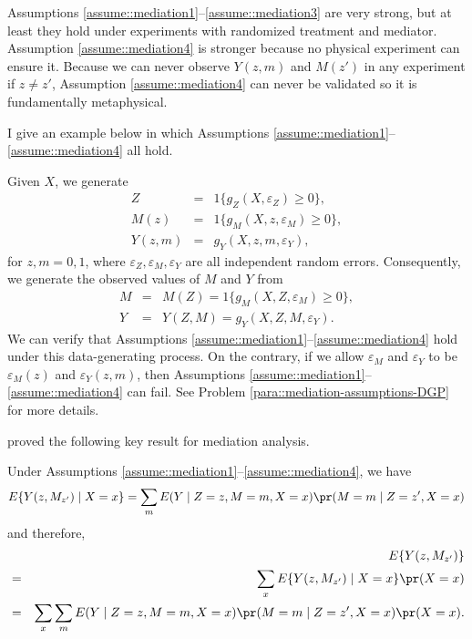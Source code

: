 Assumptions \ref{assume::mediation1}--\ref{assume::mediation3} are very strong, but at least they hold under experiments with randomized treatment and mediator. Assumption \ref{assume::mediation4} is stronger because no physical experiment can ensure it. Because we can never observe $Y(z,m)$ and $ M(z') $ in any experiment if $z\neq z'$, Assumption \ref{assume::mediation4}  can never be validated so it is fundamentally metaphysical. 

I give an example below in which Assumptions \ref{assume::mediation1}--\ref{assume::mediation4} all hold. 

\begin{example}
\label{eg::mediation-assumptions}
Given $X$, we generate
\begin{eqnarray*}
Z &=& 1\{  g_Z(X, \varepsilon_Z)  \geq 0 \} ,\\
M(z) &=& 1\{   g_M(X, z, \varepsilon_M)  \geq 0 \} ,\\
Y(z,m) &=& g_Y(X, z, m, \varepsilon_Y ),
\end{eqnarray*}
for $z,m = 0,1$,
where 
$
\varepsilon_Z, \varepsilon_M,
\varepsilon_Y 
$
are all independent random errors. Consequently, we generate the observed values of $M$ and $Y$ from
\begin{eqnarray*}
M &=& M(Z) = 1\{   g_M(X, Z, \varepsilon_M)  \geq 0 \},\\
Y &=& Y(Z,M) = g_Y(X, Z, M, \varepsilon_Y ) . 
\end{eqnarray*}
We can verify that Assumptions \ref{assume::mediation1}--\ref{assume::mediation4}  hold under this data-generating process.
On the contrary, if we allow $  \varepsilon_M$ and $\varepsilon_Y$ to be $ \varepsilon_M(z)$ and $\varepsilon_Y(z,m)$, then Assumptions \ref{assume::mediation1}--\ref{assume::mediation4} can fail. 
See Problem \ref{para::mediation-assumptions-DGP} for more details.
\end{example}



\citet{Pearl::2001} proved the following key result for mediation analysis. 

\begin{theorem}
\label{thm::mediation}
Under Assumptions \ref{assume::mediation1}--\ref{assume::mediation4},  we have 
$$
E\{ Y(z, M_{z'})  \mid X=x \} =  \sum_m E(Y\mid Z=z, M=m, X=x) \pr(M =  m \mid Z=z', X=x)   
$$
and therefore,
\begin{eqnarray*}
&&E\{ Y(z, M_{z'})   \}  \\
&=&  \sum_x E\{ Y(z, M_{z'})  \mid X=x \} \pr(X =  x )  \\
&=&  \sum_x \sum_m E(Y\mid Z=z, M=m, X=x) \pr(M =  m \mid Z=z', X=x)   \pr(X =  x ).
\end{eqnarray*}
\end{theorem}

